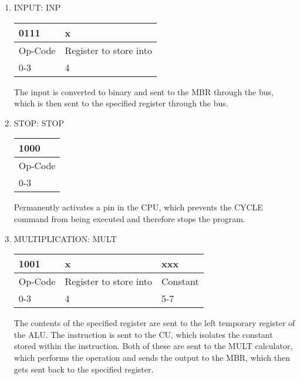 \documentclass{article}
\begin{document}
\begin{enumerate}
\item INPUT: INP\\
  \begin{tabularx}{\textwidth}{|X|X|}
    \hline 0111 & x
    \\ \hline Op-Code & Register to store into
    \\ \hline 0-3 & 4
    \\ \hline
  \end{tabularx}
The input is converted to binary and sent to the MBR through the bus, which is then sent to the specified register through the bus.

\item STOP: STOP\\
  \begin{tabularx}{\textwidth}{|X|}
    \hline 1000
    \\ \hline Op-Code
    \\ \hline 0-3
    \\ \hline
  \end{tabularx}
Permanently activates a pin in the CPU, which prevents the CYCLE command from being executed and therefore stops the program.

\item MULTIPLICATION: MULT\\
  \begin{tabularx}{\textwidth}{|X|X|X|}
    \hline 1001 & x & xxx
    \\ \hline Op-Code & Register to store into & Constant
    \\ \hline 0-3 & 4 & 5-7
    \\ \hline
  \end{tabularx}
The contents of the specified register are sent to the left temporary register of the ALU. The instruction is sent to the CU, which isolates the constant stored within the instruction. Both of these are sent to the MULT calculator, which performs the operation and sends the output to the MBR, which then gets sent back to the specified register.
  
\end{enumerate}
	
\end{document}
